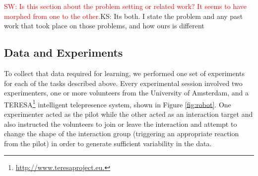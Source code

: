 \documentclass[letterpaper, 10 pt, conference]{ieeeconf}
\newcommand{\sw}[1]{\textcolor{red}{SW: #1}}
\newcommand{\ks}[1]{\textcolor{mypurp}{KS: #1}}
\begin{document}

\sw{Is this section about the problem setting or related work?  It seems to have morphed from one to the other.}\ks{Its both. I state the problem and any past work that took place on those problems, and how ours is different}



\subsection{Data and Experiments \label{subsec:data_exp}} 

To collect that data required for learning, we performed one set of experiments for each of the tasks described above. Every experimental session involved two experimenters, one or more volunteers from the University of Amsterdam, and a TERESA\footnote{\url{http://www.teresaproject.eu.}} intelligent telepresence system, shown in Figure \ref{fig:robot}.  One experimenter acted as the pilot while the other acted as an interaction target and also instructed the volunteers to join or leave the interaction and attempt to change the shape of the interaction group (triggering an appropriate reaction from the pilot) in order to generate sufficient variability in the data.  
\end{document}
